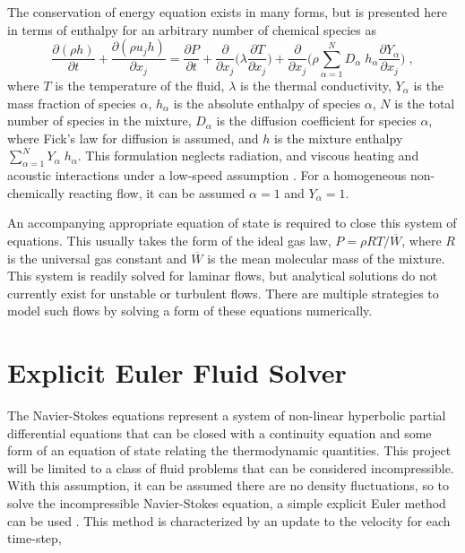 \documentclass{homework}
\begin{document}
The conservation of energy equation exists in many forms, but is presented here in terms of enthalpy for an arbitrary number of chemical species \cite{Cant2007} as
\[ \frac{\partial (\rho h)}{\partial t} + \frac{\partial (\rho u_j h)}{\partial x_j} = \frac{\partial P}{\partial t} + \frac{\partial}{\partial x_j} \Big(\lambda \frac{\partial T}{\partial x_j}\Big) + \frac{\partial}{\partial x_j} \Big(\rho \sum^N_{\alpha=1} D_\alpha \; h_\alpha \frac{\partial Y_\alpha}{\partial x_j}\Big) \; , \]
\noindent
where $T$ is the temperature of the fluid, $\lambda$ is the thermal conductivity, $Y_\alpha$ is the mass fraction of species $\alpha$, $h_\alpha$ is the absolute enthalpy of species $\alpha$, $N$ is the total number of species in the mixture, $D_\alpha$ is the diffusion coefficient for species $\alpha$, where Fick's law for diffusion is assumed, and $h$ is the mixture enthalpy $ \sum^N_{\alpha=1} Y_\alpha \; h_\alpha$. This formulation neglects radiation, and viscous heating and acoustic interactions under a low-speed assumption \cite{Cant2007}. For a homogeneous non-chemically reacting flow, it can be assumed $\alpha = 1$ and $Y_\alpha = 1$.

An accompanying appropriate equation of state is required to close this system of equations. This usually takes the form of the ideal gas law, $P = \rho R T / \overline{W}$, where $R$ is the universal gas constant and $\overline{W}$ is the mean molecular mass of the mixture. This system is readily solved for laminar flows, but analytical solutions do not currently exist for unstable or turbulent flows. There are multiple strategies to model such flows by solving a form of these equations numerically.

\section{\textbf{Explicit Euler Fluid Solver}}
\noindent The Navier-Stokes equations represent a system of non-linear hyperbolic partial differential equations that can be closed with a continuity equation and some form of an equation of state relating the thermodynamic quantities. This project will be limited to a class of fluid problems that can be considered incompressible. With this assumption, it can be assumed there are no density fluctuations, so to solve the incompressible Navier-Stokes equation, a simple explicit Euler method can be used \cite{Fletcher1998, Launder1974, Press2007}. This method is characterized by an update to the velocity for each time-step,
\end{document}
